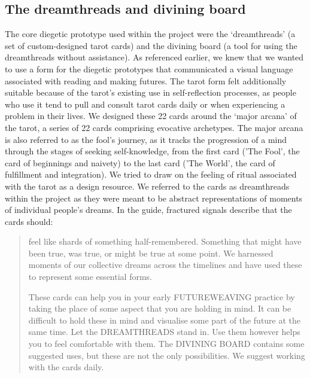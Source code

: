 \subsection{The dreamthreads and divining board}
\label{subsedc:8-4-2-dreamthreads}
The core diegetic prototype used within the project were the `dreamthreads' (a set of custom-designed tarot cards) and the divining board (a tool for using the dreamthreads without assistance). As referenced earlier, we knew that we wanted to use a form for the diegetic prototypes that communicated a visual language associated with reading and making futures. The tarot form felt additionally suitable because of the tarot's existing use in self-reflection processes, as people who use it tend to pull and consult tarot cards daily or when experiencing a problem in their lives. We designed these 22 cards around the `major arcana' of the tarot, a series of 22 cards comprising evocative archetypes. The major arcana is also referred to as the fool's journey, as it tracks the progression of a mind through the stages of seeking self-knowledge, from the first card ('The Fool', the card of beginnings and naivety) to the last card ('The World', the card of fulfillment and integration).  We tried to draw on the feeling of ritual associated with the tarot as a design resource. We referred to the cards as dreamthreads within the project as they were meant to be abstract representations of moments of individual people's dreams. In the guide, fractured signals describe that the cards should:
\begin{quote}
feel like shards of something half-remembered. Something that might have been true, was true, or might be true at some point. We harnessed moments of our collective dreams across the timelines and have used these to represent some essential forms. 

These cards can help you in your early FUTUREWEAVING practice by taking the place of some aspect that you are holding in mind. It can be difficult to hold these in mind and visualise some part of the future at the same time. Let the DREAMTHREADS stand in. Use them however helps you to feel comfortable with them. The DIVINING BOARD contains some suggested uses, but these are not the only possibilities. We suggest working with the cards daily.    
\end{quote}
